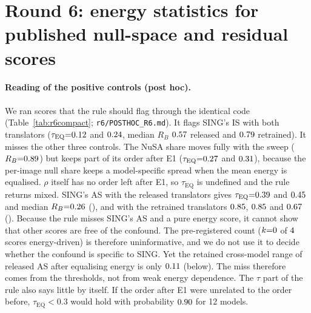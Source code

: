 \documentclass[10pt]{article}
\begin{document}
\begin{table}[H]
\centering\footnotesize
\resizebox{\linewidth}{!}{}
\caption{Round-4 calibration worlds with in-sample residuals, superseded by Table~\ref{tab:calib}; kept for comparison.}
\label{tab:calibold}
\end{table}

\section{Round 6: energy statistics for published null-space and residual scores}
\label{app:r6}
\paragraph{Reading of the positive controls (post hoc).}
We ran scores that the rule should flag through the identical code (Table~\ref{tab:r6compact}; \texttt{r6/POSTHOC\_R6.md}). It flags SING's IS with both translators ($\tau_{\mathrm{EQ}}{=}0.12$ and $0.24$, median $R_B$ $0.57$ released and $0.79$ retrained). It misses the other three controls. The NuSA share moves fully with the sweep ($R_B{=}0.89$) but keeps part of its order after E1 ($\tau_{\mathrm{EQ}}{=}0.27$ and $0.31$), because the per-image null share keeps a model-specific spread when the mean energy is equalised. $\rho$ itself has no order left after E1, so $\tau_{\mathrm{EQ}}$ is undefined and the rule returns mixed. SING's AS with the released translators gives $\tau_{\mathrm{EQ}}{=}0.39$ and $0.45$ and median $R_B{=}0.26$ (\RPASrelVerdict), and with the retrained translators $0.85$, $0.85$ and $0.67$ (\RPASretVerdict). Because the rule misses SING's AS and a pure energy score, it cannot show that other scores are free of the confound. The pre-registered count ($k{=}0$ of $4$ scores energy-driven) is therefore uninformative, and we do not use it to decide whether the confound is specific to SING. Yet the retained cross-model range of released AS after equalising energy is only $0.11$ (below). The miss therefore comes from the thresholds, not from weak energy dependence. The $\tau$ part of the rule also says little by itself. If the order after E1 were unrelated to the order before, $\tau_{\mathrm{EQ}}{<}0.3$ would hold with probability $0.90$ for 12 models.
\end{document}
